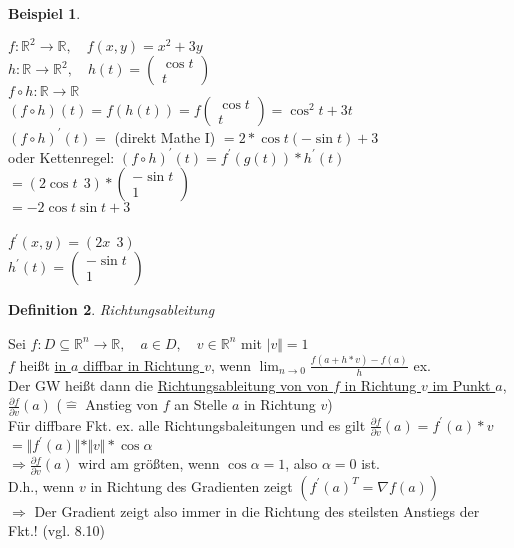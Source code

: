 \documentclass[a4paper,11pt]{article}
\newtheorem{definition}{Definition}[section]
\newtheorem{bsp}[definition]{Beispiel}
\begin{document}
\begin{bsp}
\end{bsp}
$f\colon\mathbb{R}^2\to\mathbb{R},\quad f(x,y)=x^2+3y$ \\
$h\colon\mathbb{R}\to\mathbb{R}^2,\quad h(t)=\begin{pmatrix}\cos t \\ t\end{pmatrix}$ \\
$f\circ h\colon\mathbb{R}\to\mathbb{R}$ \\
$(f\circ h)(t)=f(h(t))=f\begin{pmatrix}\cos t\\ t\end{pmatrix}=\cos^2t+3t$ \\
$(f\circ h)^\prime(t)=$ (direkt Mathe I) $=2*\cos t(-\sin t)+3$ \\
oder Kettenregel: $(f\circ h)^\prime(t)=f^\prime(g(t))*h^\prime(t)$ \\
$=(2\cos t\:\:3)*\begin{pmatrix}-\sin t\\1\end{pmatrix}$ \\
$=-2\cos t\sin t+3$ \\
\\
$f^\prime(x,y)=(2x\:\:3)$ \\
$h^\prime(t)=\begin{pmatrix}-\sin t\\1\end{pmatrix}$

\begin{definition}
	Richtungsableitung
\end{definition}
Sei $f\colon D\subseteq\mathbb{R}^n\to\mathbb{R},\quad a\in D,\quad v\in\mathbb{R}^n$ mit $\vert v\Vert=1$ \\
$f$ heißt \underline{in $a$ diffbar in Richtung $v$}, wenn $\lim_{n\to0}\frac{f(a+h*v)-f(a)}{h}$ ex. \\
Der GW heißt dann die \underline{Richtungsableitung von  von $f$ in Richtung $v$ im Punkt $a$}, \\
$\frac{\partial f}{\partial v}(a)$ ($\widehat{=}$ Anstieg von $f$ an Stelle $a$ in Richtung $v$) \\
Für diffbare Fkt. ex. alle Richtungsbaleitungen und es gilt $\frac{\partial f}{\partial v}(a)=f^\prime(a)*v$ \\
$=\Vert f^\prime(a)\Vert*\Vert v\Vert*\cos\alpha$ \\
$\Rightarrow\frac{\partial f}{\partial v}(a)$ wird am größten, wenn $\cos\alpha=1$, also $\alpha=0$ ist. \\
D.h., wenn $v$ in Richtung des Gradienten zeigt $(f^\prime(a)^T=\nabla f(a))$ \\
$\Rightarrow$ Der Gradient zeigt also immer in die Richtung des steilsten Anstiegs der Fkt.! (vgl. 8.10)
\end{document}
